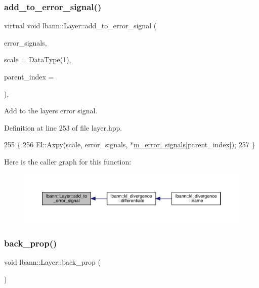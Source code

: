 \subsubsection{\texorpdfstring{add\+\_\+to\+\_\+error\+\_\+signal()}{add\_to\_error\_signal()}}
{\footnotesize\ttfamily virtual void lbann\+::\+Layer\+::add\+\_\+to\+\_\+error\+\_\+signal (\begin{DoxyParamCaption}\item[{const \hyperlink{base_8hpp_a9a697a504ae84010e7439ffec862b470}{Abs\+Dist\+Mat} \&}]{error\+\_\+signals,  }\item[{Data\+Type}]{scale = {\ttfamily DataType(1)},  }\item[{int}]{parent\+\_\+index = {} }\end{DoxyParamCaption})\hspace{0.3cm}{\ttfamily [inline]}, {\ttfamily [virtual]}}

Add to the layer\textquotesingle{}s error signal. 

Definition at line 253 of file layer.\+hpp.


\begin{DoxyCode}
255                                                          \{
256     El::Axpy(scale, error\_signals, *\hyperlink{classlbann_1_1Layer_a452e22ac81c1a799f0614b3e942ea726}{m\_error\_signals}[parent\_index]);
257   \}
\end{DoxyCode}
Here is the caller graph for this function\+:\nopagebreak
\begin{figure}[H]
\begin{center}
\leavevmode
\includegraphics[width=350pt]{classlbann_1_1Layer_a8d942eb2cd37c346edc5ff473e0494a2_icgraph}
\end{center}
\end{figure}
\mbox{\label{classlbann_1_1Layer_a0a502d9218d7dbbfd10ebebb6f917033}} 
\subsubsection{\texorpdfstring{back\+\_\+prop()}{back\_prop()}}
{\footnotesize\ttfamily void lbann\+::\+Layer\+::back\+\_\+prop (\begin{DoxyParamCaption}{ }\end{DoxyParamCaption})\hspace{0.3cm}{\ttfamily [virtual]}}

